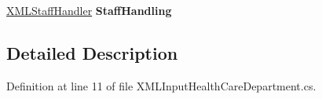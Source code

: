 \begin{DoxyCompactItemize}
\item 
\hyperlink{class_general_health_care_elements_1_1_input_1_1_x_m_l_input_classes_1_1_x_m_l_staff_handler}{X\+M\+L\+Staff\+Handler} {\bfseries Staff\+Handling}\hypertarget{class_general_health_care_elements_1_1_input_1_1_x_m_l_input_health_care_department_a585da94127fe0d54bb3d68635750e895}{}\label{class_general_health_care_elements_1_1_input_1_1_x_m_l_input_health_care_department_a585da94127fe0d54bb3d68635750e895}

\end{DoxyCompactItemize}


\subsection{Detailed Description}


Definition at line 11 of file X\+M\+L\+Input\+Health\+Care\+Department.\+cs.

